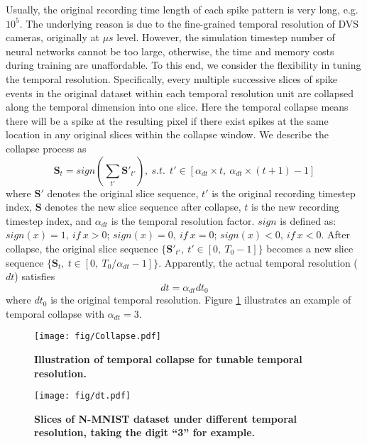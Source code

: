 \documentclass[journal,10pt,twocolumn]{IEEETran}
\begin{document}
Usually, the original recording time length of each spike pattern is very long, e.g. $10^5$. The underlying reason is due to the fine-grained temporal resolution of DVS cameras, originally at $\mu s$ level. However, the simulation timestep number of neural networks cannot be too large, otherwise, the time and memory costs during training are unaffordable. To this end, we consider the flexibility in tuning the temporal resolution. Specifically, every multiple successive slices of spike events in the original dataset within each temporal resolution unit are collapsed along the temporal dimension into one slice. Here the temporal collapse means there will be a spike at the resulting pixel if there exist spikes at the same location in any original slices within the collapse window. We describe the collapse process as
\begin{equation}
\label{equ:collapse}
\pmb{S}_t= sign(\sum_{t'} \pmb{S}'_{t'}),~s.t.~~t'\in [\alpha_{dt}\times t,~\alpha_{dt}\times(t+1)-1]
\end{equation}
where $\pmb{S}'$ denotes the original slice sequence, $t'$ is the original recording timestep index, $\pmb{S}$ denotes the new slice sequence after collapse, $t$ is the new recording timestep index, and $\alpha_{dt}$ is the temporal resolution factor. $sign$ is defined as: $sign(x)=1,~if~x>0$; $sign(x)=0,~if~x=0$; $sign(x)<0,~if~x<0$. After collapse, the original slice sequence $\{\pmb{S}'_{t'},~t'\in [0,~T_0-1]\}$ becomes a new slice sequence  $\{\pmb{S}_{t},~t\in [0,~T_0/\alpha_{dt}-1]\}$. Apparently, the actual temporal resolution ($dt$) satisfies
\begin{equation}
\label{equ:tr}
dt=\alpha_{dt}dt_0
\end{equation}
where $dt_0$ is the original temporal resolution. Figure \ref{fig:collapse} illustrates an example of temporal collapse with $\alpha_{dt}=3$. 

\begin{figure}[!htbp]
\centering     
\texttt{[image: fig/Collapse.pdf]}
\flushleft
\caption{\textbf{Illustration of temporal collapse for tunable temporal resolution.}} \label{fig:collapse} 
\end{figure}

\begin{figure}[!htbp]
\centering     
\texttt{[image: fig/dt.pdf]}
\caption{\textbf{Slices of N-MNIST dataset under different temporal resolution, taking the digit ``3'' for example.}}
\label{fig:NMNIST_dt} 
\end{figure}
\end{document}
